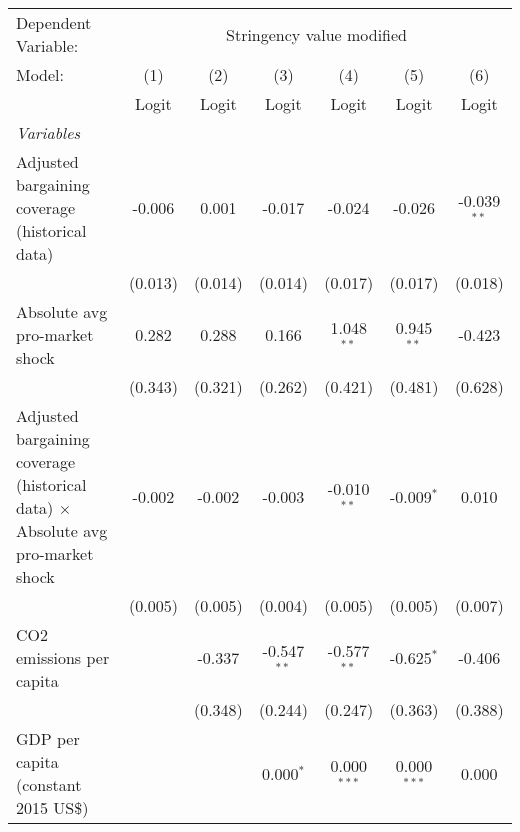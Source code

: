 
\begingroup
\centering
\begin{tabular}{lcccccc}
   \toprule
   Dependent Variable: & \multicolumn{6}{c}{Stringency value modified}\\
   Model:                                                                                 & (1)     & (2)     & (3)           & (4)           & (5)           & (6)\\  
                                                                                          &  Logit  & Logit   & Logit         & Logit         & Logit         & Logit\\  
   \midrule
   \emph{Variables}\\
   Adjusted bargaining coverage (historical data)                                         & -0.006  & 0.001   & -0.017        & -0.024        & -0.026        & -0.039$^{**}$\\   
                                                                                          & (0.013) & (0.014) & (0.014)       & (0.017)       & (0.017)       & (0.018)\\   
   Absolute avg pro-market shock                                                          & 0.282   & 0.288   & 0.166         & 1.048$^{**}$  & 0.945$^{**}$  & -0.423\\   
                                                                                          & (0.343) & (0.321) & (0.262)       & (0.421)       & (0.481)       & (0.628)\\   
   Adjusted bargaining coverage (historical data) $\times$ Absolute avg pro-market shock  & -0.002  & -0.002  & -0.003        & -0.010$^{**}$ & -0.009$^{*}$  & 0.010\\   
                                                                                          & (0.005) & (0.005) & (0.004)       & (0.005)       & (0.005)       & (0.007)\\   
   CO2 emissions per capita                                                               &         & -0.337  & -0.547$^{**}$ & -0.577$^{**}$ & -0.625$^{*}$  & -0.406\\   
                                                                                          &         & (0.348) & (0.244)       & (0.247)       & (0.363)       & (0.388)\\   
   GDP per capita (constant 2015 US\$)                                                    &         &         & 0.000$^{*}$   & 0.000$^{***}$ & 0.000$^{***}$ & 0.000\\   

\end{tabular}
